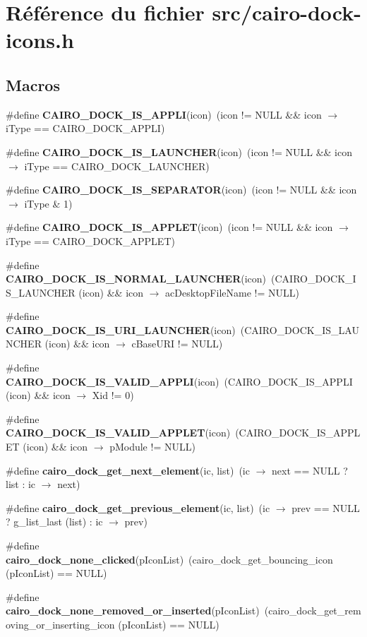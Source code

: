 \section{Référence du fichier src/cairo-dock-icons.h}
\label{cairo-dock-icons_8h}
\subsection*{Macros}
\begin{CompactItemize}
\item 
\#define {\bf CAIRO\_\-DOCK\_\-IS\_\-APPLI}(icon)~(icon != NULL \&\& icon $\rightarrow$ iType == CAIRO\_\-DOCK\_\-APPLI)
\item 
\#define {\bf CAIRO\_\-DOCK\_\-IS\_\-LAUNCHER}(icon)~(icon != NULL \&\& icon $\rightarrow$ iType == CAIRO\_\-DOCK\_\-LAUNCHER)
\item 
\#define {\bf CAIRO\_\-DOCK\_\-IS\_\-SEPARATOR}(icon)~(icon != NULL \&\& icon $\rightarrow$ iType \& 1)
\item 
\#define {\bf CAIRO\_\-DOCK\_\-IS\_\-APPLET}(icon)~(icon != NULL \&\& icon $\rightarrow$ iType  == CAIRO\_\-DOCK\_\-APPLET)
\item 
\#define {\bf CAIRO\_\-DOCK\_\-IS\_\-NORMAL\_\-LAUNCHER}(icon)~(CAIRO\_\-DOCK\_\-IS\_\-LAUNCHER (icon) \&\& icon $\rightarrow$ acDesktopFileName != NULL)
\item 
\#define {\bf CAIRO\_\-DOCK\_\-IS\_\-URI\_\-LAUNCHER}(icon)~(CAIRO\_\-DOCK\_\-IS\_\-LAUNCHER (icon) \&\& icon $\rightarrow$ cBaseURI != NULL)
\item 
\#define {\bf CAIRO\_\-DOCK\_\-IS\_\-VALID\_\-APPLI}(icon)~(CAIRO\_\-DOCK\_\-IS\_\-APPLI (icon) \&\& icon $\rightarrow$ Xid != 0)
\item 
\#define {\bf CAIRO\_\-DOCK\_\-IS\_\-VALID\_\-APPLET}(icon)~(CAIRO\_\-DOCK\_\-IS\_\-APPLET (icon) \&\& icon $\rightarrow$ pModule != NULL)
\item 
\#define {\bf cairo\_\-dock\_\-get\_\-next\_\-element}(ic, list)~(ic $\rightarrow$ next == NULL ? list : ic $\rightarrow$ next)
\item 
\#define {\bf cairo\_\-dock\_\-get\_\-previous\_\-element}(ic, list)~(ic $\rightarrow$ prev == NULL ? g\_\-list\_\-last (list) : ic $\rightarrow$ prev)
\item 
\#define {\bf cairo\_\-dock\_\-none\_\-clicked}(pIconList)~(cairo\_\-dock\_\-get\_\-bouncing\_\-icon (pIconList) == NULL)
\item 
\#define {\bf cairo\_\-dock\_\-none\_\-removed\_\-or\_\-inserted}(pIconList)~(cairo\_\-dock\_\-get\_\-removing\_\-or\_\-inserting\_\-icon (pIconList) == NULL)

\end{CompactItemize}
